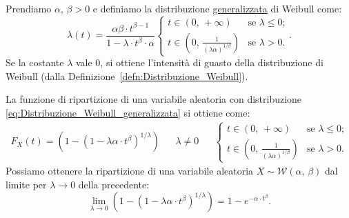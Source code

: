         \begin{defn}
            Prendiamo $\alpha,\, \beta > 0$ e definiamo la distribuzione \underline{generalizzata} di Weibull come:
            \begin{equation}\label{eq:Distribuzione_Weibull_generalizzata}
                \lambda(t) = \frac{\alpha\beta \cdot t^{\beta - 1}}{1-  \lambda\cdot t^{\beta}\cdot\alpha} \begin{cases}
                    t \in (0,\, +\infty) & \text{se $\lambda \leq 0$;} \\
                    t \in \left(0,\, \frac{1}{(\lambda\alpha)^{1 /\beta}}\right) & \text{se $\lambda > 0$.}
                \end{cases}
            .\end{equation}
            Se la costante $\lambda$ vale 0, si ottiene l'intensità di guasto della distribuzione di Weibull (dalla Definizione~\ref{defn:Distribuzione_Weibull}).
        \end{defn}
        \begin{obsv}
            La funzione di ripartizione di una variabile aleatoria con distribuzione \eqref{eq:Distribuzione_Weibull_generalizzata} si ottiene come:
            \begin{align*}
                F_X(t) = \left(1 - \left(1 - \lambda\alpha\cdot t^{\beta}\right)^{1 /\lambda}\right) & & \lambda \neq 0 & & \begin{cases}
                    t \in (0,\, +\infty) & \text{se $\lambda \leq 0$;} \\
                    t \in \left(0,\, \frac{1}{(\lambda\alpha)^{1 /\beta}}\right) & \text{se $\lambda > 0$.}
                \end{cases}
            \end{align*}
            Possiamo ottenere la ripartizione di una variabile aleatoria $X \sim \mathcal{W}(\alpha,\, \beta)$ dal limite per $\lambda \rightarrow 0$ della precedente: \[
                \lim_{\lambda \to 0} \left(1 - \left(1 - \lambda\alpha\cdot t^{\beta}\right)^{1 /\lambda}\right)
                = 1 - e^{-\alpha \cdot t^{\beta}}
            .\]
        \end{obsv}
